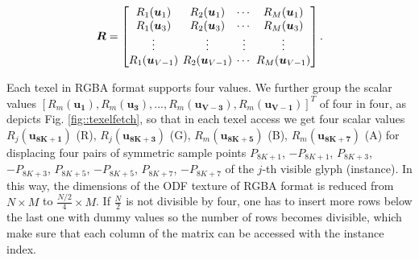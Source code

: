\documentclass[twoside,twocolumn,10pt]{article}
\begin{document}
\begin{equation}
\label{eq::R}
\bm{R} = 
\begingroup %
\setlength\arraycolsep{2pt}
\begin{bmatrix} 
    R_1(\bm{u}_1) &     R_2(\bm{u}_1)      & \cdots  &     R_M(\bm{u}_{1})  \\    
     R_1(\bm{u}_3)&     R_2(\bm{u}_3)      & \cdots  &     R_M(\bm{u}_{3}) \\
    \vdots & \vdots & \vdots & \vdots  \\    
     R_1(\bm{u}_{V-1}) & R_2(\bm{u}_{V-1}) & \cdots  & R_M(\bm{u}_{V-1})
\end{bmatrix}.
\endgroup
\end{equation}


Each texel in RGBA format supports four values. We further group the scalar values $[R_m(\bm{u_1}), R_m(\bm{u_3}), ..., R_m(\bm{u_{V-3}}), R_m(\bm{u_{V-1}})]^T$ of four in four, as depicts Fig. \ref{fig::texelfetch}, so that in each texel access we get four scalar values $R_j(\bm{u_{8K+1}})$ (R), $R_j(\bm{u_{8K+3}})$ (G), $R_m(\bm{u_{8K+5}})$ (B), $R_m(\bm{u_{8K+7}})$ (A) for displacing four pairs of symmetric sample points $P_{8K+1}$, $-P_{8K+1}$, $P_{8K+3}$, $-P_{8K+3}$, $P_{8K+5}$, $-P_{8K+5}$, $P_{8K+7}$, $-P_{8K+7}$ of the $j$-th visible glyph (instance). In this way, the dimensions of the ODF texture of RGBA format is reduced from $N \times M$ to $ \frac{N/2}{4} \times M$. If $\frac{N}{2}$ is not divisible by four, one has to insert more rows below the last one with dummy values so the number of rows becomes divisible, which make sure that each column of the matrix can be accessed with the instance index.
\end{document}
